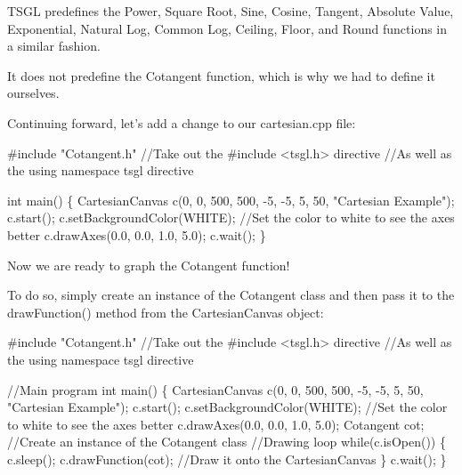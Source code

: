 T\-S\-G\-L predefines the {\ttfamily Power}, {\ttfamily Square Root}, {\ttfamily Sine}, {\ttfamily Cosine}, {\ttfamily Tangent}, {\ttfamily Absolute Value}, {\ttfamily Exponential}, {\ttfamily Natural Log}, {\ttfamily Common Log}, {\ttfamily Ceiling}, {\ttfamily Floor}, and {\ttfamily Round} functions in a similar fashion.

It does not predefine the {\ttfamily Cotangent} function, which is why we had to define it ourselves.

Continuing forward, let's add a change to our cartesian.\-cpp file\-:


\begin{DoxyCode}
\textcolor{preprocessor}{#include "Cotangent.h"} \textcolor{comment}{//Take out the #include <tsgl.h> directive}
                       \textcolor{comment}{//As well as the using namespace tsgl directive}

\textcolor{keywordtype}{int} main() \{
  CartesianCanvas c(0, 0, 500, 500, -5, -5, 5, 50, \textcolor{stringliteral}{"Cartesian Example"});
  c.start();
  c.setBackgroundColor(WHITE); \textcolor{comment}{//Set the color to white to see the axes better}
  c.drawAxes(0.0, 0.0, 1.0, 5.0);
  c.wait();
\}
\end{DoxyCode}


Now we are ready to graph the {\ttfamily Cotangent} function!

To do so, simply create an instance of the {\ttfamily Cotangent} class and then pass it to the {\ttfamily draw\-Function()} method from the Cartesian\-Canvas object\-:


\begin{DoxyCode}
\textcolor{preprocessor}{#include "Cotangent.h"} \textcolor{comment}{//Take out the #include <tsgl.h> directive}
                       \textcolor{comment}{//As well as the using namespace tsgl directive}

\textcolor{comment}{//Main program}
\textcolor{keywordtype}{int} main() \{
  CartesianCanvas c(0, 0, 500, 500, -5, -5, 5, 50, \textcolor{stringliteral}{"Cartesian Example"});
  c.start();
  c.setBackgroundColor(WHITE);  \textcolor{comment}{//Set the color to white to see the axes better}
  c.drawAxes(0.0, 0.0, 1.0, 5.0);
  Cotangent cot;  \textcolor{comment}{//Create an instance of the Cotangent class}
  \textcolor{comment}{//Drawing loop}
  \textcolor{keywordflow}{while}(c.isOpen()) \{
    c.sleep();
    c.drawFunction(cot); \textcolor{comment}{//Draw it onto the CartesianCanvas}
  \}
  c.wait();
\}
\end{DoxyCode}


